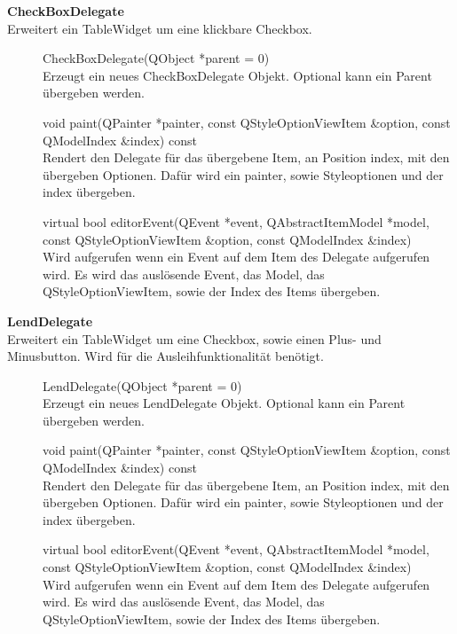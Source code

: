 \textbf{CheckBoxDelegate}\\
Erweitert ein TableWidget um eine klickbare Checkbox.
\begin{description}
	\item[ ] CheckBoxDelegate(QObject *parent = 0) \\
	Erzeugt ein neues CheckBoxDelegate Objekt. Optional kann ein Parent übergeben werden.
  	\item[ ] void paint(QPainter *painter, const QStyleOptionViewItem \&option, const QModelIndex \&index) const \\
	Rendert den Delegate für das übergebene Item, an Position index, mit den übergeben Optionen. Dafür wird ein painter, sowie Styleoptionen und der index übergeben. 
  	\item[ ] virtual bool editorEvent(QEvent *event, QAbstractItemModel *model, const QStyleOptionViewItem \&option, const QModelIndex \&index) \\
  	Wird aufgerufen wenn ein Event auf dem Item des Delegate aufgerufen wird. Es wird das auslösende Event, das Model, das QStyleOptionViewItem, sowie der Index des Items übergeben.
\end{description}

\textbf{LendDelegate}\\
Erweitert ein TableWidget um eine Checkbox, sowie einen Plus- und Minusbutton. Wird für die Ausleihfunktionalität benötigt. 
\begin{description}
	\item[ ] LendDelegate(QObject *parent = 0) \\
	Erzeugt ein neues LendDelegate Objekt. Optional kann ein Parent übergeben werden.
  	\item[ ] void paint(QPainter *painter, const QStyleOptionViewItem \&option, const QModelIndex \&index) const \\
	Rendert den Delegate für das übergebene Item, an Position index, mit den übergeben Optionen. Dafür wird ein painter, sowie Styleoptionen und der index übergeben.
  	\item[ ] virtual bool editorEvent(QEvent *event, QAbstractItemModel *model, const QStyleOptionViewItem \&option, const QModelIndex \&index) \\
  	Wird aufgerufen wenn ein Event auf dem Item des Delegate aufgerufen wird. Es wird das auslösende Event, das Model, das QStyleOptionViewItem, sowie der Index des Items übergeben.
\end{description}	

